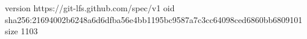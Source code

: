 version https://git-lfs.github.com/spec/v1
oid sha256:21694002b6248a6d6dfba56e4bb1195bc9587a7c3cc64098ced6860bb6809101
size 1103
